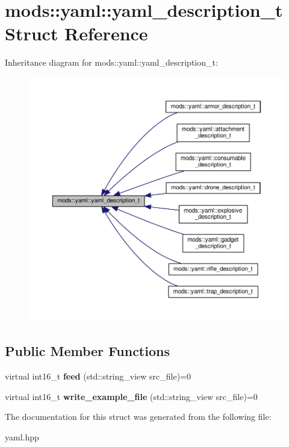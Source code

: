 \hypertarget{structmods_1_1yaml_1_1yaml__description__t}{}\section{mods\+:\+:yaml\+:\+:yaml\+\_\+description\+\_\+t Struct Reference}
\label{structmods_1_1yaml_1_1yaml__description__t}


Inheritance diagram for mods\+:\+:yaml\+:\+:yaml\+\_\+description\+\_\+t\+:
\nopagebreak
\begin{figure}[H]
\begin{center}
\leavevmode
\includegraphics[width=350pt]{structmods_1_1yaml_1_1yaml__description__t__inherit__graph}
\end{center}
\end{figure}
\subsection*{Public Member Functions}
\begin{DoxyCompactItemize}
\item 
\mbox{\label{structmods_1_1yaml_1_1yaml__description__t_a41d8c86bfa7033739e0ce46ec18822b9}} 
virtual int16\+\_\+t {\bfseries feed} (std\+::string\+\_\+view src\+\_\+file)=0
\item 
\mbox{\label{structmods_1_1yaml_1_1yaml__description__t_a8e8598ee352c7ddf6ddae48955907537}} 
virtual int16\+\_\+t {\bfseries write\+\_\+example\+\_\+file} (std\+::string\+\_\+view src\+\_\+file)=0
\end{DoxyCompactItemize}


The documentation for this struct was generated from the following file\+:\begin{DoxyCompactItemize}
\item 
yaml.\+hpp\end{DoxyCompactItemize}
